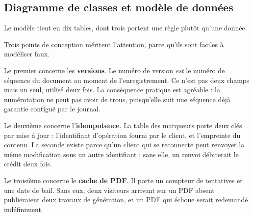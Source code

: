 \subsection{Diagramme de classes et modèle de données}

Le modèle tient en dix tables, dont trois portent une règle plutôt qu'une donnée.


Trois points de conception méritent l'attention, parce qu'ils sont faciles à
modéliser faux.

Le premier concerne les \textbf{versions}. Le numéro de version \emph{est} le
numéro de séquence du document au moment de l'enregistrement. Ce n'est pas deux
champs mais un seul, utilisé deux fois. La conséquence pratique est agréable : la
numérotation ne peut pas avoir de trous, puisqu'elle suit une séquence déjà
garantie contiguë par le journal.

Le deuxième concerne l'\textbf{idempotence}. La table des marqueurs porte deux
clés par mise à jour : l'identifiant d'opération fourni par le client, et
l'empreinte du contenu. La seconde existe parce qu'un client qui se reconnecte
peut renvoyer la même modification sous un autre identifiant ; sans elle, un
renvoi débiterait le crédit deux fois.

Le troisième concerne le \textbf{cache de PDF}. Il porte un compteur de
tentatives et une date de bail. Sans eux, deux visiteurs arrivant sur un PDF
absent publieraient deux travaux de génération, et un PDF qui échoue serait
redemandé indéfiniment.

